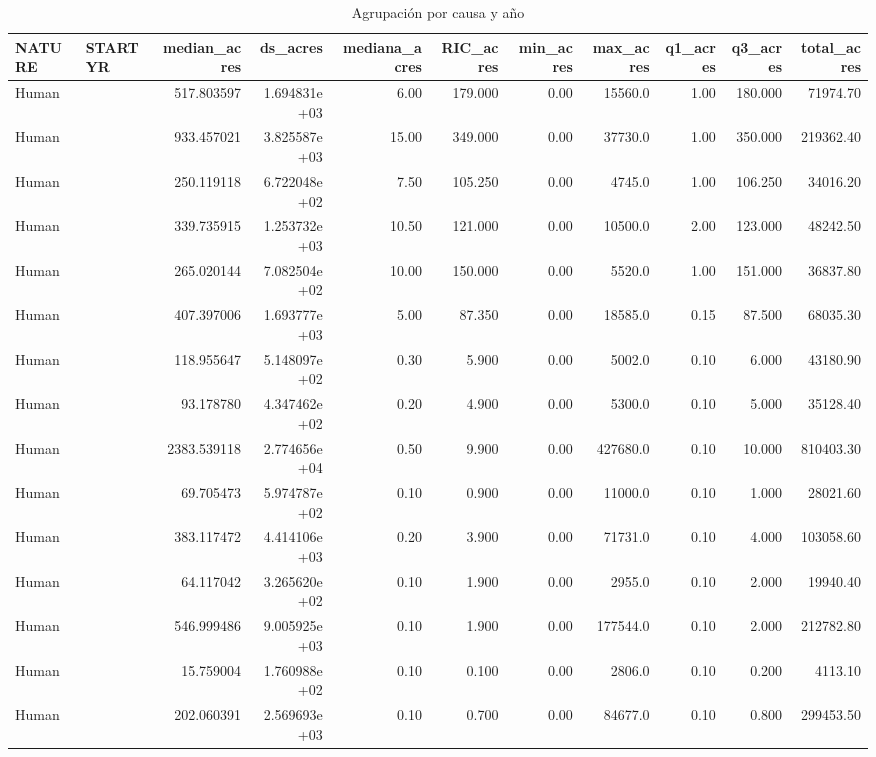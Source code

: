\documentclass[
]{book}
\begin{document}
\begin{table}

\caption{\label{tab:unnamed-chunk-4}Agrupación por causa y año}
\centering
\begin{tabular}[t]{l|>{\raggedleft\arraybackslash}p{20em}|r|r|r|r|r|r|r|r|r}
\hline
NATURE & STARTYR & median\_acres & ds\_acres & mediana\_acres & RIC\_acres & min\_acres & max\_acres & q1\_acres & q3\_acres & total\_acres\\
\hline
Human & 1980 & 517.803597 & 1.694831e+03 & 6.00 & 179.000 & 0.00 & 15560.0 & 1.00 & 180.000 & 71974.70\\
\hline
Human & 1981 & 933.457021 & 3.825587e+03 & 15.00 & 349.000 & 0.00 & 37730.0 & 1.00 & 350.000 & 219362.40\\
\hline
Human & 1982 & 250.119118 & 6.722048e+02 & 7.50 & 105.250 & 0.00 & 4745.0 & 1.00 & 106.250 & 34016.20\\
\hline
Human & 1983 & 339.735915 & 1.253732e+03 & 10.50 & 121.000 & 0.00 & 10500.0 & 2.00 & 123.000 & 48242.50\\
\hline
Human & 1984 & 265.020144 & 7.082504e+02 & 10.00 & 150.000 & 0.00 & 5520.0 & 1.00 & 151.000 & 36837.80\\
\hline
Human & 1985 & 407.397006 & 1.693777e+03 & 5.00 & 87.350 & 0.00 & 18585.0 & 0.15 & 87.500 & 68035.30\\
\hline
Human & 1986 & 118.955647 & 5.148097e+02 & 0.30 & 5.900 & 0.00 & 5002.0 & 0.10 & 6.000 & 43180.90\\
\hline
Human & 1987 & 93.178780 & 4.347462e+02 & 0.20 & 4.900 & 0.00 & 5300.0 & 0.10 & 5.000 & 35128.40\\
\hline
Human & 1988 & 2383.539118 & 2.774656e+04 & 0.50 & 9.900 & 0.00 & 427680.0 & 0.10 & 10.000 & 810403.30\\
\hline
Human & 1989 & 69.705473 & 5.974787e+02 & 0.10 & 0.900 & 0.00 & 11000.0 & 0.10 & 1.000 & 28021.60\\
\hline
Human & 1990 & 383.117472 & 4.414106e+03 & 0.20 & 3.900 & 0.00 & 71731.0 & 0.10 & 4.000 & 103058.60\\
\hline
Human & 1991 & 64.117042 & 3.265620e+02 & 0.10 & 1.900 & 0.00 & 2955.0 & 0.10 & 2.000 & 19940.40\\
\hline
Human & 1992 & 546.999486 & 9.005925e+03 & 0.10 & 1.900 & 0.00 & 177544.0 & 0.10 & 2.000 & 212782.80\\
\hline
Human & 1993 & 15.759004 & 1.760988e+02 & 0.10 & 0.100 & 0.00 & 2806.0 & 0.10 & 0.200 & 4113.10\\
\hline
Human & 1994 & 202.060391 & 2.569693e+03 & 0.10 & 0.700 & 0.00 & 84677.0 & 0.10 & 0.800 & 299453.50\\

\end{tabular}
\end{table}
\end{document}
